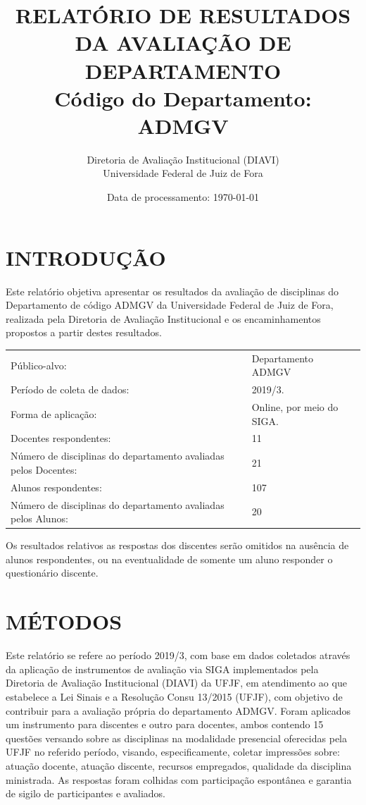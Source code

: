 \documentclass[a4paper,10pt]{article}
\date{Data de processamento: \today}
\begin{document}
\author{Diretoria de Avaliação Institucional (DIAVI) \\ Universidade Federal de Juiz de Fora}

\title{RELATÓRIO DE RESULTADOS DA AVALIAÇÃO DE DEPARTAMENTO\\ Código do Departamento: ADMGV}
\maketitle
\section{INTRODUÇÃO}
Este relatório objetiva apresentar os resultados da avaliação de disciplinas do Departamento     de código ADMGV da Universidade Federal de Juiz de Fora, realizada pela     Diretoria de Avaliação Institucional e os encaminhamentos propostos a     partir destes resultados.

\begin{center}
\begin{tabularx}{\linewidth}{X|l}

Público-alvo:& Departamento  ADMGV\\

Período de coleta de dados:& 2019/3.\\

Forma de aplicação:& Online, por meio do SIGA.\\

Docentes respondentes:& 11\\

Número de disciplinas do departamento avaliadas pelos Docentes:& 21\\

Alunos   respondentes:& 107\\

Número de disciplinas do departamento  avaliadas pelos   Alunos:& 20\\
\end{tabularx}
\end{center}

Os resultados relativos as respostas dos discentes serão omitidos na ausência de alunos respondentes, ou na eventualidade de somente um aluno responder o questionário discente.
\section{MÉTODOS}
Este relatório se refere ao período 2019/3, com base em dados     coletados através da aplicação de instrumentos de avaliação via SIGA     implementados pela Diretoria de Avaliação Institucional (DIAVI) da UFJF, em atendimento     ao que estabelece a Lei Sinais e a Resolução Consu 13/2015 (UFJF),     com objetivo de contribuir para a avaliação própria do departamento ADMGV.    Foram aplicados um instrumento para discentes e outro para docentes, ambos contendo     15 questões versando sobre as disciplinas na modalidade presencial oferecidas pela UFJF no     referido período, visando, especificamente, coletar impressões sobre: atuação docente, atuação discente,     recursos empregados, qualidade da disciplina ministrada.     As respostas foram colhidas      com participação espontânea e garantia de    sigilo de participantes e avaliados.
\end{document}
